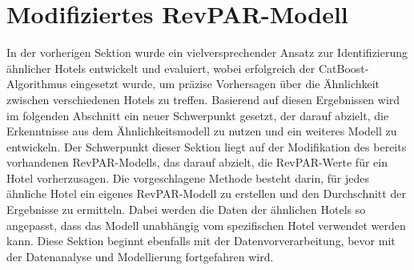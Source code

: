 \chapter{Modifiziertes RevPAR-Modell}
\label{sec:revpar}
In der vorherigen Sektion wurde ein vielversprechender Ansatz zur Identifizierung ähnlicher Hotels entwickelt und evaluiert, wobei erfolgreich der CatBoost-Algorithmus eingesetzt wurde, um präzise Vorhersagen über die Ähnlichkeit zwischen verschiedenen Hotels zu treffen. Basierend auf diesen Ergebnissen wird im folgenden Abschnitt ein neuer Schwerpunkt gesetzt, der darauf abzielt, die Erkenntnisse aus dem Ähnlichkeitsmodell zu nutzen und ein weiteres Modell zu entwickeln.
\newline
\newline 
Der Schwerpunkt dieser Sektion liegt auf der Modifikation des bereits vorhandenen RevPAR-Modells, das darauf abzielt, die RevPAR-Werte für ein Hotel vorherzusagen. Die vorgeschlagene Methode besteht darin, für jedes ähnliche Hotel ein eigenes RevPAR-Modell zu erstellen und den Durchschnitt der Ergebnisse zu ermitteln. Dabei werden die Daten der ähnlichen Hotels so angepasst, dass das Modell unabhängig vom spezifischen Hotel verwendet werden kann. Diese Sektion beginnt ebenfalls mit der Datenvorverarbeitung, bevor mit der Datenanalyse und Modellierung fortgefahren wird.





